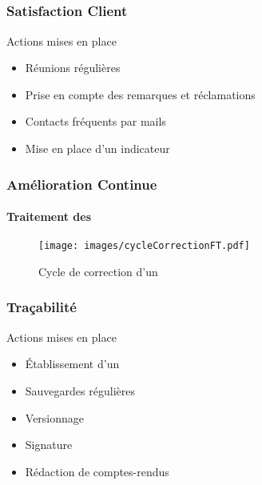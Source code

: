 \speaker{\Pierre}

\subsection{} %

\begin{frame}
\frametitle{Satisfaction Client}
Actions mises en place
	\begin{itemize}
		\item Réunions régulières
		\item Prise en compte des remarques et réclamations
		\item Contacts fréquents par mails
		\item Mise en place d'un indicateur
	\end{itemize}
\end{frame}

\begin{frame}
\frametitle{Amélioration Continue}
\framesubtitle{Traitement des \FT{}}
\begin{center}
\begin{figure}
\texttt{[image: images/cycleCorrectionFT.pdf]}
\caption{Cycle de correction d'un \FT{}}
\end{figure}
\end{center}
\end{frame}


\begin{frame}
\frametitle{Traçabilité}
Actions mises en place
	\begin{itemize}
		\item Établissement d'un \PGC{}
		\item Sauvegardes régulières
		\item Versionnage
		\item Signature
		\item Rédaction de comptes-rendus
	\end{itemize}
\end{frame}